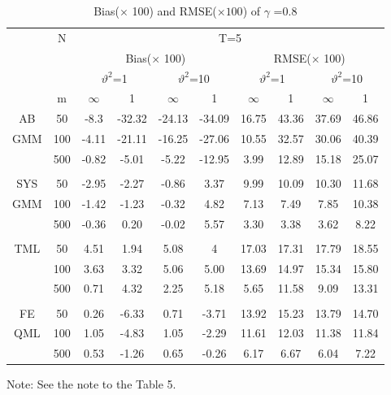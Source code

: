 \documentclass[12pt,a4paper,hyperref]{article}
\begin{document}
\begin{center}
\begin{table}[H]
\caption{Bias($\times$ 100) and RMSE($\times 100$) of $\gamma$ =0.8}   \label{table7}
\centering
\begin{tabular} {*{10}{c}}
\toprule
&N& \multicolumn{8}{c}{T=5}\\
\cmidrule(lr){3-10}
&& \multicolumn{4}{c}{Bias($\times$ 100)} & \multicolumn{4}{c}{RMSE($\times$ 100)}\\
  \cmidrule(lr){3-6} \cmidrule(lr){7-10}
&&  \multicolumn{2}{c}{$\vartheta^{2}$=1}&\multicolumn{2}{c}{$\vartheta^{2}$=10} & \multicolumn{2}{c}{$\vartheta^{2}$=1}&\multicolumn{2}{c}{$\vartheta^{2}$=10}\\
\cmidrule(lr){3-4} \cmidrule(lr){5-6}\cmidrule(lr){7-8}\cmidrule(lr){9-10}
& m & $\infty$ &1&$\infty$ &1&$\infty$ &1&$\infty$&1\\
\cmidrule(lr){3-4} \cmidrule(lr){5-6}\cmidrule(lr){7-8}\cmidrule(lr){9-10}
AB&50&-8.3&-32.32&	-24.13&	-34.09&	16.75&43.36&37.69&46.86\\
GMM &100&-4.11 &-21.11 & -16.25& -27.06&10.55 & 32.57& 30.06&40.39 \\
&500&-0.82&-5.01&-5.22&-12.95&3.99&12.89&15.18	&25.07 \\
\midrule \\
\cmidrule(lr){3-4} \cmidrule(lr){5-6}\cmidrule(lr){7-8}\cmidrule(lr){9-10}
SYS &50&-2.95&	-2.27	&-0.86	&3.37	&	9.99&	10.09&	10.30&	11.68
\\
 GMM&100&-1.42	&-1.23	&-0.32&	4.82	&	7.13	&7.49&	7.85	&10.38
\\
&500&-0.36	&0.20	&-0.02&	5.57	&	3.30	&3.38&	3.62&	8.22
\\
 \midrule \\
\cmidrule(lr){3-4} \cmidrule(lr){5-6}\cmidrule(lr){7-8}\cmidrule(lr){9-10}
 TML&50&	4.51	&1.94	&	5.08&	4&	17.03	&	17.31	&17.79&		18.55  \\
 &100& 3.63 &3.32 &5.06 &5.00 &13.69 & 14.97&15.34 &15.80 \\
 &500	&	0.71	&4.32&	2.25&	5.18&	5.65&11.58	&	9.09&13.31  \\
 \midrule \\
\cmidrule(lr){3-4} \cmidrule(lr){5-6}\cmidrule(lr){7-8}\cmidrule(lr){9-10}
  FE&50&0.26	&-6.33&	0.71	&-3.71&	13.92&	15.23&	13.79&	14.70
  \\
   QML&100 &1.05&	-4.83&	1.05	&-2.29	&11.61	&12.03	&11.38	&11.84
 \\
&500&0.53&	-1.26	&0.65&	-0.26&	6.17	&6.67	&6.04	&7.22
\\
\bottomrule
\end{tabular}
\begin{tablenotes}
      \small
      \item Note: See the note to the Table 5.
    \end{tablenotes}
\end{table}
\end{center}
\end{document}
